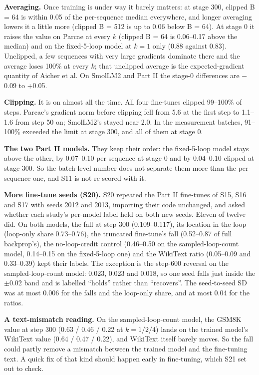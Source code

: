 \documentclass[10pt]{article}
\begin{document}
\textbf{Averaging.} Once training is under way it barely matters: at stage 300, clipped B = 64 is within 0.05 of the per-sequence median everywhere, and longer averaging lowers it a little more (clipped B = 512 is up to 0.06 below B = 64). At stage 0 it raises the value on Parcae at every $k$ (clipped B = 64 is 0.06--0.17 above the median) and on the fixed-5-loop model at $k = 1$ only (0.88 against 0.83). Unclipped, a few sequences with very large gradients dominate there and the average loses 100\% at every $k$; that unclipped average is the expected-gradient quantity of Aicher et al. On SmolLM2 and Part II the stage-0 differences are $-$0.09 to +0.05.

\textbf{Clipping.} It is on almost all the time. All four fine-tunes clipped 99--100\% of steps. Parcae's gradient norm before clipping fell from 5.6 at the first step to 1.1--1.6 from step 50 on; SmolLM2's stayed near 2.0. In the measurement batches, 91--100\% exceeded the limit at stage 300, and all of them at stage 0.

\textbf{The two Part II models.} They keep their order: the fixed-5-loop model stays above the other, by 0.07--0.10 per sequence at stage 0 and by 0.04--0.10 clipped at stage 300. So the batch-level number does not separate them more than the per-sequence one, and S11 is not re-scored with it.

\textbf{More fine-tune seeds (S20).} S20 repeated the Part II fine-tunes of S15, S16 and S17 with seeds 2012 and 2013, importing their code unchanged, and asked whether each study's per-model label held on both new seeds. Eleven of twelve did. On both models, the fall at step 300 (0.109--0.117), its location in the loop (loop-only share 0.73--0.76), the truncated fine-tune's fall (0.52--0.87 of full backprop's), the no-loop-credit control (0.46--0.50 on the sampled-loop-count model, 0.14--0.15 on the fixed-5-loop one) and the WikiText ratio (0.05--0.09 and 0.33--0.39) kept their labels. The exception is the step-600 reversal on the sampled-loop-count model: 0.023, 0.023 and 0.018, so one seed falls just inside the $\pm$0.02 band and is labelled ``holds'' rather than ``recovers''. The seed-to-seed SD was at most 0.006 for the falls and the loop-only share, and at most 0.04 for the ratios.

\textbf{A text-mismatch reading.} On the sampled-loop-count model, the GSM8K value at step 300 (0.63 / 0.46 / 0.22 at $k = 1 / 2 / 4$) lands on the trained model's WikiText value (0.64 / 0.47 / 0.22), and WikiText itself barely moves. So the fall could partly remove a mismatch between the trained model and the fine-tuning text. A quick fix of that kind should happen early in fine-tuning, which S21 set out to check.
\end{document}
